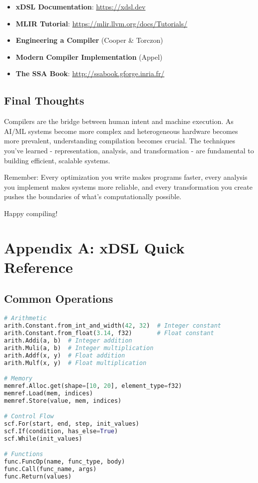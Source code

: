 \documentclass[11pt,a4paper]{article}
\begin{document}
\begin{itemize}
    \item \textbf{xDSL Documentation}: \url{https://xdsl.dev}
    \item \textbf{MLIR Tutorial}: \url{https://mlir.llvm.org/docs/Tutorials/}
    \item \textbf{Engineering a Compiler} (Cooper \& Torczon)
    \item \textbf{Modern Compiler Implementation} (Appel)
    \item \textbf{The SSA Book}: \url{http://ssabook.gforge.inria.fr/}
\end{itemize}

\subsection{Final Thoughts}

Compilers are the bridge between human intent and machine execution. As AI/ML systems become more complex and heterogeneous hardware becomes more prevalent, understanding compilation becomes crucial. The techniques you've learned - representation, analysis, and transformation - are fundamental to building efficient, scalable systems.

Remember: Every optimization you write makes programs faster, every analysis you implement makes systems more reliable, and every transformation you create pushes the boundaries of what's computationally possible.

Happy compiling!

\appendix

\section{Appendix A: xDSL Quick Reference}

\subsection{Common Operations}

\begin{lstlisting}[language=Python, caption=xDSL Operations Quick Reference]
# Arithmetic
arith.Constant.from_int_and_width(42, 32)  # Integer constant
arith.Constant.from_float(3.14, f32)       # Float constant
arith.Addi(a, b)  # Integer addition
arith.Muli(a, b)  # Integer multiplication
arith.Addf(x, y)  # Float addition
arith.Mulf(x, y)  # Float multiplication

# Memory
memref.Alloc.get(shape=[10, 20], element_type=f32)
memref.Load(mem, indices)
memref.Store(value, mem, indices)

# Control Flow
scf.For(start, end, step, init_values)
scf.If(condition, has_else=True)
scf.While(init_values)

# Functions
func.FuncOp(name, func_type, body)
func.Call(func_name, args)
func.Return(values)
\end{lstlisting}
\end{document}
